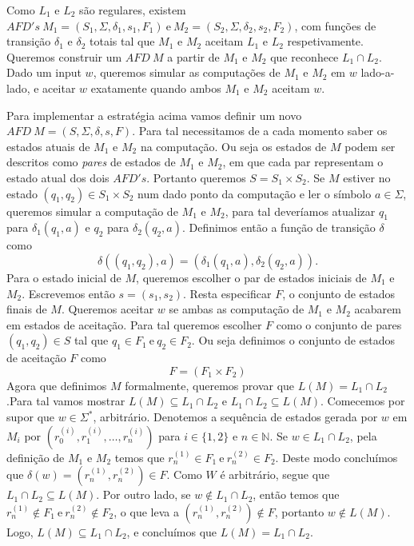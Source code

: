 \documentclass{article}
\begin{document}
Como $L_1$ e $L_2$ são regulares, existem $AFD's \ M_1 = (S_1, \Sigma, \delta_1, s_1, F_1) \ \textrm{e} \ M_2 = (S_2, \Sigma, \delta_2, s_2, F_2)$, com funções de transição $\delta_1 \textrm{ e } \delta_2$ totais tal que $M_1$ e $M_2$ aceitam $L_1$ e $L_2$ respetivamente. Queremos construir um $AFD \ M$ a partir de $M_1$ e $M_2$ que reconhece $L_1 \cap L_2$. Dado um input $w$, queremos simular as computações de $M_1$ e $M_2$ em $w$ lado-a-lado, e aceitar $w$ exatamente quando ambos $M_1$ e $M_2$ aceitam $w$.

Para implementar a estratégia acima vamos definir um novo $AFD \ M = (S, \Sigma, \delta, s, F)$. Para tal necessitamos de a cada momento saber os estados atuais de $M_1$ e $M_2$ na computação. Ou seja os estados de $M$ podem ser descritos como \textit{pares} de estados de $M_1$ e $M_2$, em que cada par representam o estado atual dos dois $AFD's$. Portanto queremos $S = S_1 \times S_2$. Se $M$ estiver no estado $(q_1,q_2) \in S_1 \times S_2$ num dado ponto da computação e ler o símbolo $a \in \Sigma$, queremos simular a computação de $M_1$ e $M_2$, para tal deveríamos atualizar $q_1$ para $\delta_1(q_1, a)$ e $q_2$ para $\delta_2(q_2, a)$. Definimos então a função de transição $\delta$ como
\[
  \delta((q_1,q_2),a) = (\delta_1(q_1, a), \delta_2(q_2, a)).
\]
Para o estado inicial de $M$, queremos escolher o par de estados iniciais de $M_1$ e $M_2$. Escrevemos então $s = (s_1,s_2)$. Resta especificar $F$, o conjunto de estados finais de $M$. Queremos aceitar $w$ se ambas as computação de $M_1$ e $M_2$ acabarem em estados de aceitação. Para tal queremos escolher $F$ como o conjunto de pares $(q_1,q_2) \in S$ tal que $q_1 \in F_1 \ \textrm{e} \ q_2 \in F_2$. Ou seja definimos o conjunto de estados de aceitação $F$ como
\[
  F = (F_1 \times F_2)
\]
Agora que definimos $M$ formalmente, queremos provar que $L(M) = L_1 \cap L_2$.Para tal vamos mostrar $L(M) \subseteq L_1 \cap L_2$ e $L_1 \cap L_2 \subseteq L(M)$. Comecemos por supor que $w \in \Sigma^\ast$, arbitrário. Denotemos a sequência de estados gerada por $w$ em $M_i$ por $(r_0^{(i)},r_1^{(i)},\dots,r_n^{(i)})$ para $i \in \{1,2\}$ e $n \in \mathbb{N}$. Se $w \in L_1 \cap L_2$, pela definição de $M_1$ e $M_2$ temos que $r_n^{(1)} \in F_1 \ \textrm{e} \ r_n^{(2)} \in F_2$. Deste modo concluímos que $\delta(w) = (r_n^{(1)}, r_n^{(2)}) \in F$. Como $W$ é arbitrário, segue que $L_1 \cap L_2 \subseteq L(M)$. Por outro lado, se $w \notin L_1 \cap L_2$, então temos que $r_n^{(1)} \notin F_1 \ \textrm{e} \ r_n^{(2)} \notin F_2$, o que leva a $(r_n^{(1)}, r_n^{(2)}) \notin F$, portanto $w \notin L(M)$. Logo, $L(M) \subseteq L_1 \cap L_2$, e concluímos que $L(M) = L_1 \cap L_2$.
\end{document}
